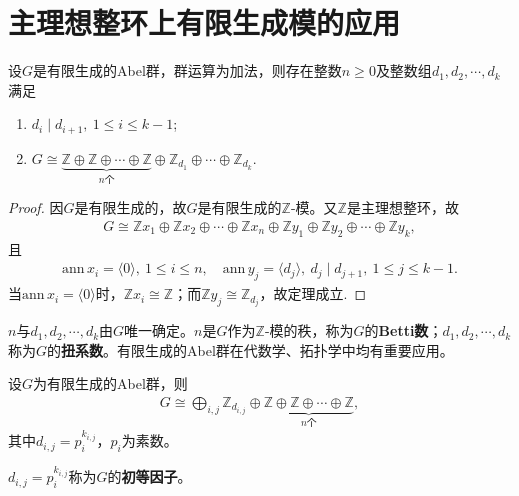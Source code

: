 \documentclass[../../main.tex]{subfiles}%
\begin{document}
\section{主理想整环上有限生成模的应用}

\begin{theorem}
设$G$是有限生成的Abel群，群运算为加法，则存在整数$n\geqslant0$及整数组$d_1,d_2,\cdots,d_k$满足
\begin{enumerate}[(1)]
\item $d_i\mid d_{i+1},\ 1\leqslant i\leqslant k-1$;
\item $G\cong \underbrace{\mathbb{Z}\oplus\mathbb{Z}\oplus\cdots\oplus\mathbb{Z}}_{n\text{个}}\oplus\mathbb{Z}_{d_1}\oplus\cdots\oplus\mathbb{Z}_{d_k}$.
\end{enumerate}
\end{theorem}
\begin{proof}
因$G$是有限生成的，故$G$是有限生成的$\mathbb{Z}$-模。又$\mathbb{Z}$是主理想整环，故
\begin{align*}
G\cong \mathbb{Z}x_1\oplus\mathbb{Z}x_2\oplus\cdots\oplus\mathbb{Z}x_n\oplus\mathbb{Z}y_1\oplus\mathbb{Z}y_2\oplus\cdots\oplus\mathbb{Z}y_k,
\end{align*}
且
\begin{align*}
\mathrm{ann}\,x_i=\langle0\rangle,\ 1\leqslant i\leqslant n,\quad \mathrm{ann}\,y_j=\langle d_j\rangle,\ d_j\mid d_{j+1},\ 1\leqslant j\leqslant k-1.
\end{align*}
当$\mathrm{ann}\,x_i=\langle0\rangle$时，$\mathbb{Z}x_i\cong\mathbb{Z}$；而$\mathbb{Z}y_j\cong\mathbb{Z}_{d_j}$，故定理成立.
\end{proof}
\begin{remark}
$n$与$d_1,d_2,\cdots,d_k$由$G$唯一确定。$n$是$G$作为$\mathbb{Z}$-模的秩，称为$G$的\textbf{Betti数}；$d_1,d_2,\cdots,d_k$称为$G$的\textbf{扭系数}。有限生成的Abel群在代数学、拓扑学中均有重要应用。
\end{remark}

\begin{theorem}
设$G$为有限生成的Abel群，则
\begin{align*}
G\cong \bigoplus_{i,j}\mathbb{Z}_{d_{i,j}}\oplus\underbrace{\mathbb{Z}\oplus\mathbb{Z}\oplus\cdots\oplus\mathbb{Z}}_{n\text{个}},
\end{align*}
其中$d_{i,j}=p_i^{k_{i,j}}$，$p_i$为素数。
\end{theorem}
\begin{remark}
$d_{i,j}=p_i^{k_{i,j}}$称为$G$的\textbf{初等因子}。
\end{remark}
\end{document}
